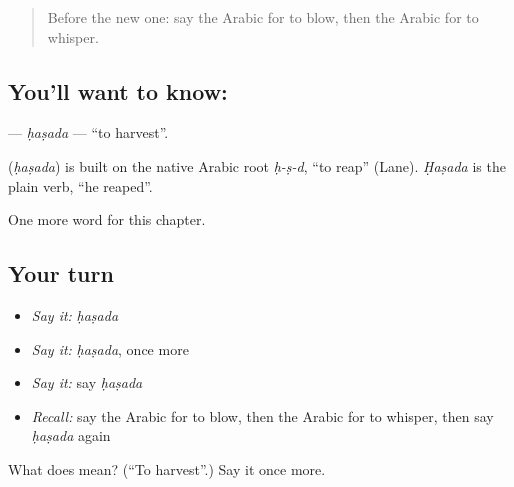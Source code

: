 \begin{quote}
Before the new one: say the Arabic for to blow, then the Arabic for to whisper.
\end{quote}

\subsection*{You'll want to know: }
\textbf{} — \emph{ḥaṣada} — \textquotedblleft{}to harvest\textquotedblright{}.

\begin{cousinweb}
\textbf{} (\emph{ḥaṣada}) is built on the native Arabic root \emph{ḥ-ṣ-d}, \textquotedblleft{}to reap\textquotedblright{} (Lane). \emph{Ḥaṣada} is the plain verb, \textquotedblleft{}he reaped\textquotedblright{}.
\end{cousinweb}

\begin{grammarlens}[title={What you've built}]
One more word for this chapter.
\end{grammarlens}

\subsection*{Your turn}
\begin{itemize}
\raggedright
  \item \emph{Say it:} \emph{ḥaṣada}
  \item \emph{Say it:} \emph{ḥaṣada}, once more
  \item \emph{Say it:} say \emph{ḥaṣada}
  \item \emph{Recall:} say the Arabic for to blow, then the Arabic for to whisper, then say \emph{ḥaṣada} again
\end{itemize}

\begin{tcolorbox}[breakable,colback=teal!4,colframe=teal!35!black,title={Before you move on}]
What does  mean? (\textquotedblleft{}To harvest\textquotedblright{}.) Say it once more.
\end{tcolorbox}
